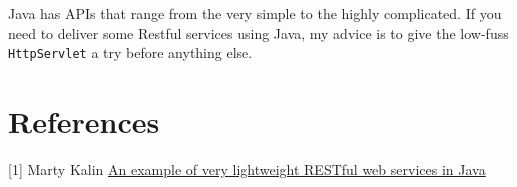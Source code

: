 \documentclass[12pt]{article}
\begin{document}
Java has APIs that range from the very simple to the highly complicated. If you need to deliver some Restful services using Java, my advice is to give the low-fuss \verb|HttpServlet| a try before anything else.

\section{References}

[1] Marty Kalin \href{https://opensource.com/article/20/7/restful-services-java}{An example of very lightweight RESTful web services in Java}
\end{document}
